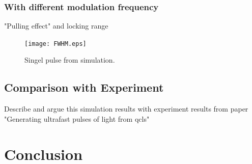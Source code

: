 \documentclass[11pt,final]{scrbook}
\begin{document}
\subsection{With different modulation frequency} 
"Pulling effect" and locking range

\begin{figure}[htbp]
\begin{center}
\texttt{[image: FWHM.eps]}
\caption{Singel pulse from simulation.}
\label{fig:FWHM}
\end{center}
\end{figure}

\section{Comparison with Experiment}
Describe and argue this simulation results with experiment results from paper "Generating ultrafast pulses of light from qcls"
\chapter{Conclusion}





\renewcommand*{\bibname}{Bibliography} %
{}


\end{document}
